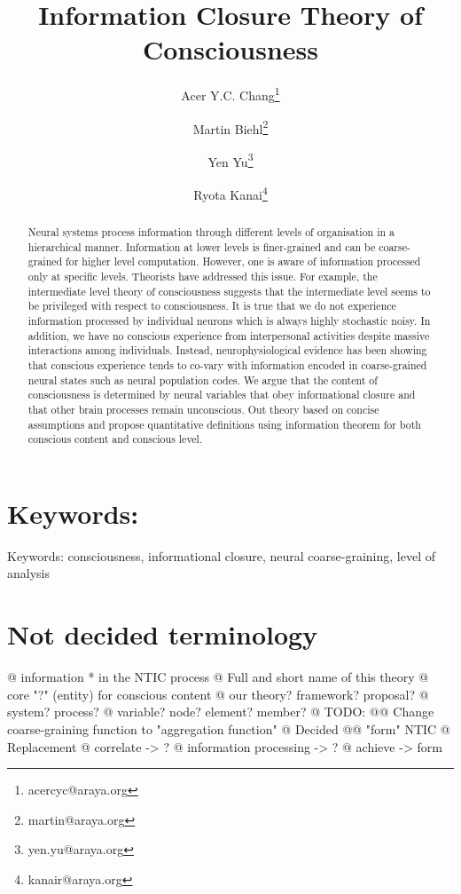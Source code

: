 \documentclass[utf8]{article}
\title{Information Closure Theory of Consciousness}
\author[]{Acer Y.C. Chang\thanks{acercyc@araya.org}}
\author[]{Martin Biehl\thanks{martin@araya.org}}
\author[]{Yen Yu\thanks{yen.yu@araya.org}}
\author[]{Ryota Kanai\thanks{kanair@araya.org }}
\affil[]{ARAYA, Inc., Tokyo, Japan}
\begin{document}
    \linenumbers
	\maketitle
	\tableofcontents


	\begin{abstract}
		Neural systems process information through different levels of organisation in a hierarchical manner. Information at lower levels is finer-grained and can be coarse-grained for higher level computation. However, one is aware of information processed only at specific levels. Theorists have addressed this issue. For example, the intermediate level theory of consciousness suggests that the intermediate level seems to be privileged with respect to consciousness. It is true that we do not experience information processed by individual neurons which is always highly stochastic noisy. In addition, we have no conscious experience from interpersonal activities despite massive interactions among individuals. Instead, neurophysiological evidence has been showing that conscious experience tends to co-vary with information encoded in coarse-grained neural states such as neural population codes. We argue that the content of consciousness is determined by neural variables that obey informational closure and that other brain processes remain unconscious. Out theory based on concise assumptions and propose quantitative definitions using information theorem for both conscious content and conscious level.
		
	\end{abstract}


	\section*{Keywords:}
	Keywords: consciousness, informational closure, neural coarse-graining, level of analysis


    \newpage
    \section*{Not decided terminology}
        \begin{ants}
            @ information * in the NTIC process
            @ Full and short name of this theory
            @ core "?" (entity) for conscious content 
            @ our theory? framework? proposal? 
            @ system? process?
            @ variable? node? element? member?
            @ TODO:
                @@ Change coarse-graining function to "aggregation function"
            @ Decided
                @@ "form" NTIC
            @ Replacement
                @ correlate -> ?
                @ information processing -> ?
                @ achieve -> form
        \end{ants}
\end{document}
